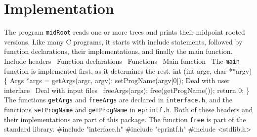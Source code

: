 \section{Implementation}
The program \texttt{midRoot} reads one or more trees and prints their
midpoint rooted versions. Like many C programs, it starts with include
statements, followed by function declarations, their implementations,
and finally the main function.
\nwenddocs{}\endmoddef\nwstartdeflinemarkup\nwenddeflinemarkup
\LA{}Include headers~{\nwtagstyle{}}\RA{}
\LA{}Function declarations~{\nwtagstyle{}}\RA{}
\LA{}Functions~{\nwtagstyle{}}\RA{}
\LA{}Main function~{\nwtagstyle{}}\RA{}
\nwendcode{}\nwdocspar
The \texttt{main} function is implemented first, as it
determines the rest.
\nwenddocs{}\endmoddef\nwstartdeflinemarkup{}\nwenddeflinemarkup
int (int argc, char **argv) \{
  Args *args = getArgs(argc, argv);
  setProgName(argv[0]);
  \LA{}Deal with user interface~{\nwtagstyle{}}\RA{}
  \LA{}Deal with input files~{\nwtagstyle{}}\RA{}
  freeArgs(args);
  free(getProgName());
  return 0;
\}
\nwendcode{}\nwdocspar
The functions \texttt{getArgs} and \texttt{freeArgs} are declared in
\texttt{interface.h}, and the functions \texttt{setProgName} and
\texttt{getProgName} in \texttt{eprintf.h}. Both of these headers and
their implementations are part of this package. The function
\texttt{free} is part of the standard library.
\nwenddocs{}\endmoddef\nwstartdeflinemarkup{}\nwenddeflinemarkup
#include "interface.h"
#include "eprintf.h"
#include <stdlib.h>
